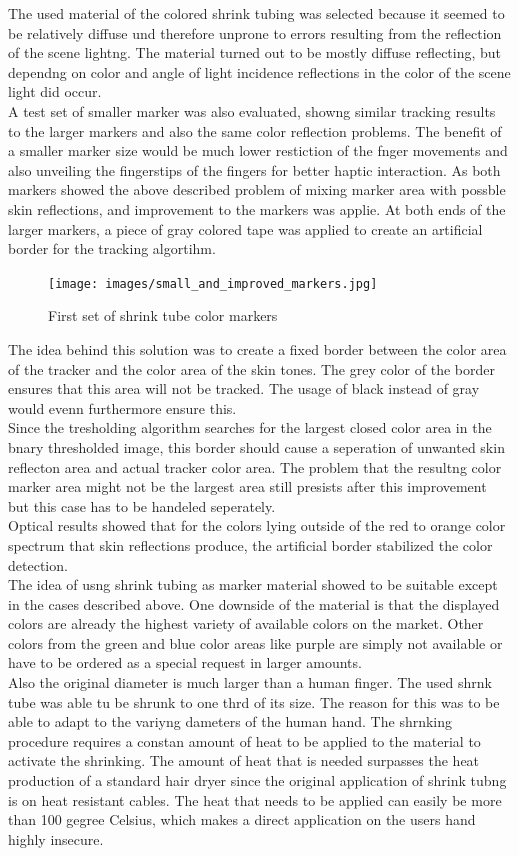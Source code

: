 The used material of the colored shrink tubing was selected because it seemed to be relatively diffuse und therefore unprone to errors resulting from the reflection of the scene lightng. The material turned out to be mostly diffuse reflecting, but dependng on color and angle of light incidence reflections in the color of the scene light did occur.\\
A test set of smaller marker was also evaluated, showng similar tracking results to the larger markers and also the same color reflection problems. The benefit of a smaller marker size would be much lower restiction of the fnger movements and also unveiling the fingerstips of the fingers for better haptic interaction.
As both markers showed the above described problem of mixing marker area with possble skin reflections, and improvement to the markers was applie. At both ends of the larger markers, a piece of gray colored tape was applied to create an artificial border for the tracking algortihm.
\begin{figure}[H]
\centering
\texttt{[image: images/small\_and\_improved\_markers.jpg]}
\caption{First set of shrink tube color markers }
\label{img:second_color_markers}
\end{figure}
The idea behind this solution was to create a fixed border between the color area of the tracker and the color area of the skin tones. The grey color of the border ensures that this area will not be tracked. The usage of black instead of gray would evenn furthermore ensure this. 
\\Since the tresholding algorithm searches for the largest closed color area in the bnary thresholded image, this border should cause a seperation of unwanted skin reflecton area and actual tracker color area. The problem that the resultng color marker area might not be the largest area still presists after this improvement but this case has to be handeled seperately.
\\Optical results showed that for the colors lying outside of the red to orange color spectrum that skin reflections produce, the artificial border stabilized the color detection.
\\The idea of usng shrink tubing as marker material showed to be suitable except in the cases described above. One downside of the material is that the displayed colors are already the highest variety of available colors on the market. Other colors from the green and blue color areas like purple are simply not available or have to be ordered as a special request in larger amounts.
\\Also the original diameter is much larger than a human finger. The used shrnk tube was able tu be shrunk to one thrd of its size. The reason for this was to be able to adapt to the variyng dameters of the human hand. The shrnking procedure requires a constan amount of heat to be applied to the material to activate the shrinking. The amount of heat that is needed surpasses the heat production of a standard hair dryer since the original application of shrink tubng is on heat resistant cables. The heat that needs to be applied can easily be more than 100 gegree Celsius, which makes a direct application on the users hand highly insecure.
